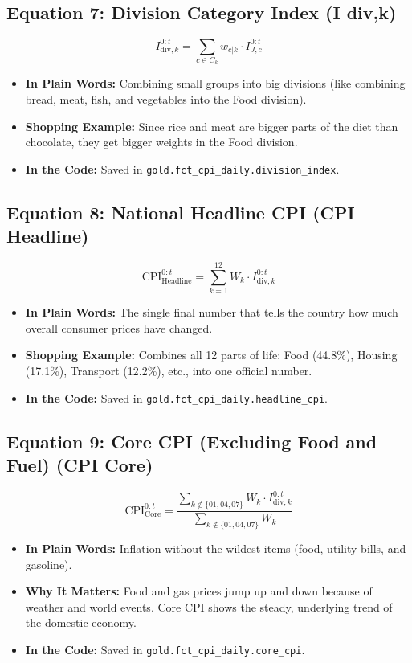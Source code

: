 \documentclass[11pt,a4paper,oneside]{article}
\begin{document}
\subsection{Equation 7: Division Category Index (I {div,k})}
\begin{equation}
I_{\text{div}, k}^{0:t} = \sum_{c \in C_k} w_{c|k} \cdot I_{J, c}^{0:t}
\end{equation}
\begin{itemize}
    \item \textbf{In Plain Words:} Combining small groups into big divisions (like combining bread, meat, fish, and vegetables into the Food division).
    \item \textbf{Shopping Example:} Since rice and meat are bigger parts of the diet than chocolate, they get bigger weights in the Food division.
    \item \textbf{In the Code:} Saved in \texttt{gold.fct\_cpi\_daily.division\_index}.
\end{itemize}

\subsection{Equation 8: National Headline CPI (CPI {Headline})}
\begin{equation}
\text{CPI}_{\text{Headline}}^{0:t} = \sum_{k=1}^{12} W_k \cdot I_{\text{div}, k}^{0:t}
\end{equation}
\begin{itemize}
    \item \textbf{In Plain Words:} The single final number that tells the country how much overall consumer prices have changed.
    \item \textbf{Shopping Example:} Combines all 12 parts of life: Food (44.8\%), Housing (17.1\%), Transport (12.2\%), etc., into one official number.
    \item \textbf{In the Code:} Saved in \texttt{gold.fct\_cpi\_daily.headline\_cpi}.
\end{itemize}

\subsection{Equation 9: Core CPI (Excluding Food and Fuel) (CPI {Core})}
\begin{equation}
\text{CPI}_{\text{Core}}^{0:t} = \frac{\sum_{k \notin \{01, 04, 07\}} W_k \cdot I_{\text{div}, k}^{0:t}}{\sum_{k \notin \{01, 04, 07\}} W_k}
\end{equation}
\begin{itemize}
    \item \textbf{In Plain Words:} Inflation without the wildest items (food, utility bills, and gasoline).
    \item \textbf{Why It Matters:} Food and gas prices jump up and down because of weather and world events. Core CPI shows the steady, underlying trend of the domestic economy.
    \item \textbf{In the Code:} Saved in \texttt{gold.fct\_cpi\_daily.core\_cpi}.
\end{itemize}
\end{document}
